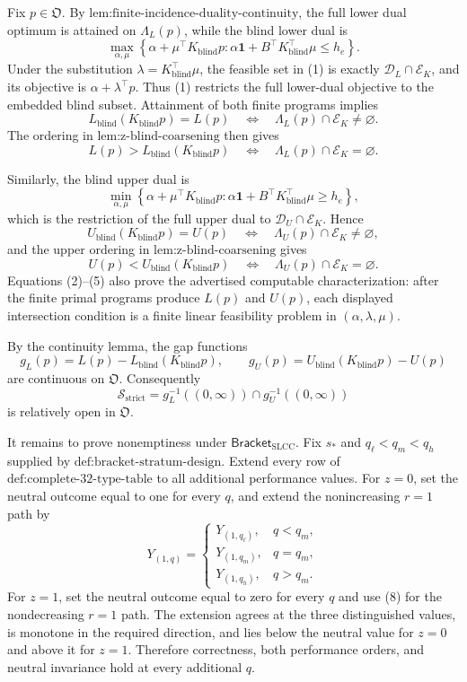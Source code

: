 Fix \(p\in\mathfrak O\).  By \(\text{lem:finite-incidence-duality-continuity}\), the full lower dual optimum is attained on \(\Lambda_L(p)\), while the blind lower dual is
\[
\max_{\alpha,\mu}\left\{\alpha+\mu^{\top}K_{\mathrm{blind}}p:
\alpha\mathbf 1+B^{\top}K_{\mathrm{blind}}^{\top}\mu\leq h_e\right\}.
\tag{1}
\]
Under the substitution \(\lambda=K_{\mathrm{blind}}^{\top}\mu\), the feasible set in (1) is exactly \(\mathcal D_L\cap\mathcal E_K\), and its objective is \(\alpha+\lambda^{\top}p\).  Thus (1) restricts the full lower-dual objective to the embedded blind subset.  Attainment of both finite programs implies
\[
L_{\mathrm{blind}}(K_{\mathrm{blind}}p)=L(p)
\quad\Longleftrightarrow\quad
\Lambda_L(p)\cap\mathcal E_K\neq\varnothing.
\tag{2}
\]
The ordering in \(\text{lem:z-blind-coarsening}\) then gives
\[
L(p)>L_{\mathrm{blind}}(K_{\mathrm{blind}}p)
\quad\Longleftrightarrow\quad
\Lambda_L(p)\cap\mathcal E_K=\varnothing.
\tag{3}
\]

Similarly, the blind upper dual is
\[
\min_{\alpha,\mu}\left\{\alpha+\mu^{\top}K_{\mathrm{blind}}p:
\alpha\mathbf 1+B^{\top}K_{\mathrm{blind}}^{\top}\mu\geq h_e\right\},
\tag{4}
\]
which is the restriction of the full upper dual to \(\mathcal D_U\cap\mathcal E_K\).  Hence
\[
U_{\mathrm{blind}}(K_{\mathrm{blind}}p)=U(p)
\quad\Longleftrightarrow\quad
\Lambda_U(p)\cap\mathcal E_K\neq\varnothing,
\]
and the upper ordering in \(\text{lem:z-blind-coarsening}\) gives
\[
U(p)<U_{\mathrm{blind}}(K_{\mathrm{blind}}p)
\quad\Longleftrightarrow\quad
\Lambda_U(p)\cap\mathcal E_K=\varnothing.
\tag{5}
\]
Equations (2)--(5) also prove the advertised computable characterization: after the finite primal programs produce \(L(p)\) and \(U(p)\), each displayed intersection condition is a finite linear feasibility problem in \((\alpha,\lambda,\mu)\).

By the continuity lemma, the gap functions
\[
g_L(p)=L(p)-L_{\mathrm{blind}}(K_{\mathrm{blind}}p),
\qquad
g_U(p)=U_{\mathrm{blind}}(K_{\mathrm{blind}}p)-U(p)
\tag{6}
\]
are continuous on \(\mathfrak O\).  Consequently
\[
\mathcal S_{\mathrm{strict}}
=g_L^{-1}((0,\infty))\cap g_U^{-1}((0,\infty))
\tag{7}
\]
is relatively open in \(\mathfrak O\).

It remains to prove nonemptiness under \(\mathsf{Bracket}_{\mathrm{SLCC}}\).  Fix \(s_*\) and \(q_\ell<q_m<q_h\) supplied by \(\text{def:bracket-stratum-design}\).  Extend every row of \(\text{def:complete-32-type-table}\) to all additional performance values.  For \(z=0\), set the neutral outcome equal to one for every \(q\), and extend the nonincreasing \(r=1\) path by
\[
Y_{(1,q)}=
\begin{cases}
Y_{(1,q_\ell)},&q<q_m,\\
Y_{(1,q_m)},&q=q_m,\\
Y_{(1,q_h)},&q>q_m.
\end{cases}
\tag{8}
\]
For \(z=1\), set the neutral outcome equal to zero for every \(q\) and use (8) for the nondecreasing \(r=1\) path.  The extension agrees at the three distinguished values, is monotone in the required direction, and lies below the neutral value for \(z=0\) and above it for \(z=1\).  Therefore correctness, both performance orders, and neutral invariance hold at every additional \(q\).

